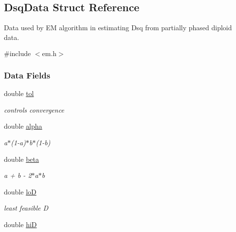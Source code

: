 \hypertarget{struct_dsq_data}{\subsection{Dsq\+Data Struct Reference}
\label{struct_dsq_data}
}


Data used by E\+M algorithm in estimating Dsq from partially phased diploid data.  




{\ttfamily \#include $<$em.\+h$>$}

\subsubsection*{Data Fields}
\begin{DoxyCompactItemize}
\item 
\hypertarget{struct_dsq_data_a2817fb4b70921ae3a9722c1fbf0f4a58}{double \hyperlink{struct_dsq_data_a2817fb4b70921ae3a9722c1fbf0f4a58}{tol}}\label{struct_dsq_data_a2817fb4b70921ae3a9722c1fbf0f4a58}

\begin{DoxyCompactList}\small\item\em controls convergence \end{DoxyCompactList}\item 
\hypertarget{struct_dsq_data_a40c3fdd276e9c89802f1173601460afc}{double \hyperlink{struct_dsq_data_a40c3fdd276e9c89802f1173601460afc}{alpha}}\label{struct_dsq_data_a40c3fdd276e9c89802f1173601460afc}

\begin{DoxyCompactList}\small\item\em a$\ast$(1-\/a)$\ast$b$\ast$(1-\/b) \end{DoxyCompactList}\item 
\hypertarget{struct_dsq_data_a9104819f67f85886818033b08e56cd5d}{double \hyperlink{struct_dsq_data_a9104819f67f85886818033b08e56cd5d}{beta}}\label{struct_dsq_data_a9104819f67f85886818033b08e56cd5d}

\begin{DoxyCompactList}\small\item\em a + b -\/ 2$\ast$a$\ast$b \end{DoxyCompactList}\item 
\hypertarget{struct_dsq_data_aa1b3a9ab84e0b900689f4f87939f93b5}{double \hyperlink{struct_dsq_data_aa1b3a9ab84e0b900689f4f87939f93b5}{lo\+D}}\label{struct_dsq_data_aa1b3a9ab84e0b900689f4f87939f93b5}

\begin{DoxyCompactList}\small\item\em least feasible D \end{DoxyCompactList}\item 
\hypertarget{struct_dsq_data_abfab53744a39ef6d7bdebc293344d7a9}{double \hyperlink{struct_dsq_data_abfab53744a39ef6d7bdebc293344d7a9}{hi\+D}}\label{struct_dsq_data_abfab53744a39ef6d7bdebc293344d7a9}


\end{DoxyCompactItemize}
